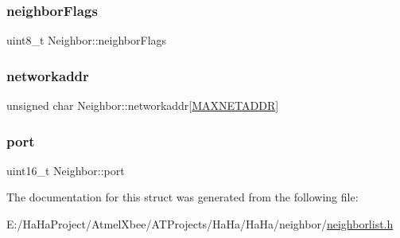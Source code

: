 \mbox{\label{struct_neighbor_ae2738c5549836389e9d6c0e8f78df134}} 
\subsubsection{\texorpdfstring{neighbor\+Flags}{neighborFlags}}
{\footnotesize\ttfamily uint8\+\_\+t Neighbor\+::neighbor\+Flags}

\mbox{\label{struct_neighbor_a6bc80628de6e4c9aeff5110d6deef9d4}} 
\subsubsection{\texorpdfstring{networkaddr}{networkaddr}}
{\footnotesize\ttfamily unsigned char Neighbor\+::networkaddr\mbox{[}\hyperlink{haha_utils_8h_a64e48eb75238bd3d7a053f19071044a8}{M\+A\+X\+N\+E\+T\+A\+D\+DR}\mbox{]}}

\mbox{\label{struct_neighbor_a18b5cd42623d929f155daa37b6b1bff1}} 
\subsubsection{\texorpdfstring{port}{port}}
{\footnotesize\ttfamily uint16\+\_\+t Neighbor\+::port}



The documentation for this struct was generated from the following file\+:\begin{DoxyCompactItemize}
\item 
E\+:/\+Ha\+Ha\+Project/\+Atmel\+Xbee/\+A\+T\+Projects/\+Ha\+Ha/\+Ha\+Ha/neighbor/\hyperlink{neighborlist_8h}{neighborlist.\+h}\end{DoxyCompactItemize}
